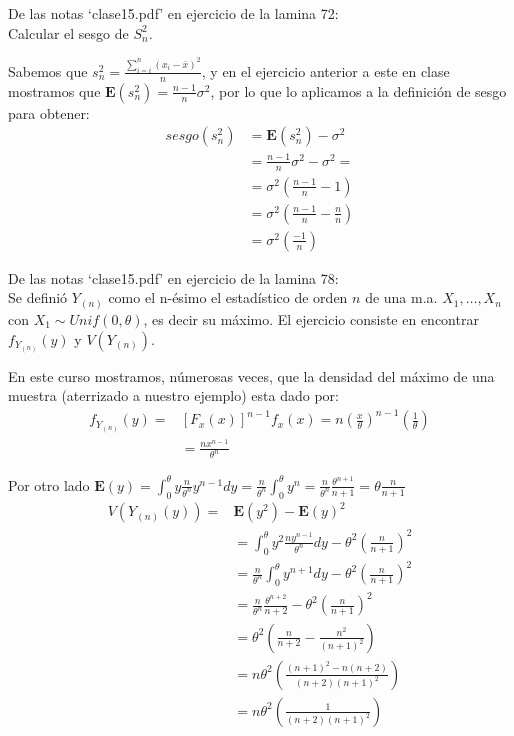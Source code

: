 \documentclass[letter]{memoir} %
\newenvironment{cframe}[1][blue]
  {\begin{tcolorbox}[colframe=#1,colback=white]}
  {\end{tcolorbox}}
\begin{document}
\begin{enumerate}
\begin{cframe}[teal]
 \item De las notas ‘clase15.pdf’ en ejercicio de la lamina 72: \\
Calcular el sesgo de $S_n^2$.
\end{cframe}
Sabemos que $s_n^2 = \frac{\sum_{i=i}^n(x_i-\bar{x})^2}{n} $, y en el ejercicio anterior a este en clase mostramos que $\mathbf{E}(s_n^2) = \frac{n-1}{n}\sigma ^2$, por lo que lo aplicamos a la definición de sesgo para obtener:
\[
\begin{split}
sesgo(s_n^2) & = \mathbf{E}(s_n^2) - \sigma^2 \\ 
& = \frac{n-1}{n}\sigma ^2 - \sigma ^2= \\
& = \sigma^2 \left(\frac{n-1}{n} - 1 \right) \\
& = \sigma^2 \left(\frac{n-1}{n} - \frac{n}{n} \right)\\
&  = \sigma ^2 \left(\frac{-1}{n} \right)
\end{split}
\]
\begin{cframe}[violet]
\item  De las notas ‘clase15.pdf’ en ejercicio de la lamina 78: \\
Se definió $Y_{(n)}$ como el n-ésimo el estadístico de orden $n$ de una m.a. $X_1,\dots, X_n$ con $X_1 \sim Unif(0,\theta)$, es decir su máximo. El ejercicio consiste en encontrar $f_{Y_{(n)}}(y)$ y $V({Y_{(n)}})$. \\
\end{cframe}
En este curso mostramos, númerosas veces, que la densidad del máximo de una muestra (aterrizado a nuestro ejemplo) esta dado por: 
\[
\begin{split}
f_{Y_{(n)}}(y) = & [F_x(x)]^{n-1}f_x(x) = n \left( \frac{x}{\theta} \right)^{n-1}\left( \frac{1}{\theta} \right) \\
& = \frac{nx^{n-1}}{\theta ^n}
\end{split}
\]

Por otro lado
$\mathbf{E}(y) = \int_0^\theta y\frac{n}{\theta^n}y^{n-1}dy = \frac{n}{\theta^n}\int_0^\theta y^{n} =  \frac{n}{\theta^n} \frac{\theta^{n+1}}{n+1} = \theta \frac{n}{n+1}$
\[
\begin{split}
V({Y_{(n)}}(y)) = & \mathbf{E} (y^2) -\mathbf{E}(y)^2 \\
& = \int_0^\theta y^2 \frac{ny^{n-1}}{\theta ^n}dy - \theta^2(\frac{n}{n+1})^2 \\
& = \frac{n }{\theta ^n} \int_0^\theta y^{n+1} dy - \theta^2(\frac{n}{n+1})^2 \\
& =\frac{n}{\theta^n}\frac{\theta^{n+2}}{n+2} - \theta^2(\frac{n}{n+1})^2\\
& = \theta^2(\frac{n}{n+2}-\frac{n^2}{(n+1)^2}) \\
& = n\theta^2\left( \frac{(n+1)^2 -n(n+2)}{(n+2)(n+1)^2}  \right)\\
& = n\theta^2\left( \frac{1}{(n+2)(n+1)^2}  \right)
\end{split}
\]



\end{enumerate}
\end{document}
